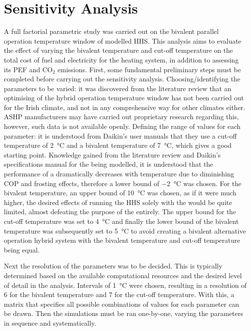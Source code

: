 \section{Sensitivity Analysis}\label{sec:sensanal}
A full factorial parametric study was carried out on the bivalent parallel operation temperature window of modelled \ac{HHS}. This analysis aims to evaluate the effect of varying the bivalent temperature and cut-off temperature on the total cost of fuel and electricity for the heating system, in addition to assessing its \ac{PEF} and $\text{CO}_2$ emissions. First, some fundamental preliminary steps must be completed before carrying out the sensitivity analysis. Choosing/identifying the parameters to be varied: it was discovered from the literature review that an optimising of the hybrid operation temperature window has not been carried out for the Irish climate, and not in any comprehensive way for other climates either. \ac{ASHP} manufacturers may have carried out proprietary research regarding this, however, such data is not available openly. Defining the range of values for each parameter: it is understood from Daikin's user manuals that they use a cut-off temperature of \qty{2}{\celsius} and a bivalent temperature of \qty{7}{\celsius}, which gives a good starting point. Knowledge gained from the literature review and Daikin's specifications manual for the \HP being modelled, it is understood that the performance of a \HP dramatically decreases with temperature due to diminishing \ac{COP} and frosting effects, therefore a lower bound of \qty{-2}{\celsius} was chosen. For the bivalent temperature, an upper bound of \qty{10}{\celsius} was chosen, as if it were much higher, the desired effects of running the \ac{HHS} solely with the \HP would be quite limited, almost defeating the purpose of the \HP entirely. The upper bound for the cut-off temperature was set to \qty{4}{\celsius} and finally the lower bound of the bivalent temperature was subsequently set to \qty{5}{\celsius} to avoid creating a bivalent alternative operation hybrid system with the bivalent temperature and cut-off temperature being equal.

Next the resolution of the parameters was to be decided. This is typically determined based on the available computational resources and the desired level of detail in the analysis. Intervals of \qty{1}{\celsius} were chosen, resulting in a resolution of 6 for the bivalent temperature and 7 for the cut-off temperature. With this, a matrix that specifies all possible combinations of values for each parameter can be drawn. Then the simulations must be ran one-by-one, varying the parameters in sequence and systematically.

